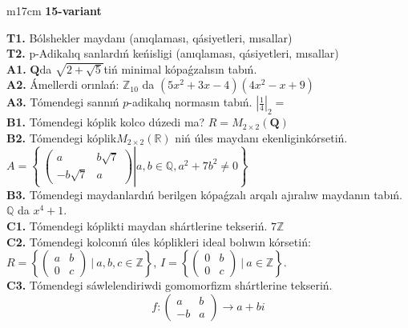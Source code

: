 \documentclass{article}
\begin{document}
\begin{tabular}{m{17cm}}
\textbf{15-variant}
\newline

\textbf{T1.} Bólshekler maydanı (anıqlaması, qásiyetleri, mısallar) \\
\textbf{T2.} p-Adikalıq sanlardıń keńisligi (anıqlaması, qásiyetleri, mısallar) \\
\textbf{A1.} \(\mathbf{Q}\)da \(\sqrt{2 + \sqrt{5}}\)tiń minimal kópaǵzalısın tabıń. \\
\textbf{A2.} Ámellerdi orınlań: \(\mathbb{Z}_{10}\) da \(\left( 5x^{2} + 3x - 4 \right)\left( 4x^{2} - x + 9 \right)\) \\
\textbf{A3.} Tómendegi sannıń \(p\)-adikalıq normasın tabıń. \(|\frac{1}{4}|_{2} =\) \\
\textbf{B1.} Tómendegi kóplik kolco dúzedi ma? \(R = M_{2 \times 2}\left( \mathbf{Q} \right)\) \\
\textbf{B2.} Tómendegi kóplik\(M_{2 \times 2}\left( \mathbb{R} \right)\) niń úles maydanı ekenliginkórsetiń. \(A = \left\{ \left. \ \begin{pmatrix}
a & b\sqrt{7} \\
 - b\sqrt{7} & a
\end{pmatrix} \right|a,b\mathbb{\in Q},a^{2} + 7b^{2} \neq 0 \right\}\) \\
\textbf{B3.} Tómendegi maydanlardıń berilgen kópaǵzalı arqalı ajıralıw maydanın tabıń. \(\mathbb{Q}\) da \(x^{4} + 1\). \\
\textbf{C1.} Tómendegi kóplikti maydan shártlerine tekseriń. \(7\mathbb{Z}\) \\
\textbf{C2.} Tómendegi kolconıń úles kóplikleri ideal bolıwın kórsetiń:
\(R = \left\{ \begin{pmatrix}
a & b \\
0 & c
\end{pmatrix}\ |\ a,b,c \in \mathbb{Z} \right\}\), \(I = \left\{ \begin{pmatrix}
0 & b \\
0 & c
\end{pmatrix}\ |\ a \in \mathbb{Z} \right\}\). \\
\textbf{C3.} Tómendegi sáwlelendiriwdi gomomorfizm shártlerine tekseriń.
\[f:\begin{pmatrix}
a & b \\
 - b & a
\end{pmatrix} \rightarrow a + bi\] \\

\end{tabular}
\vspace{1cm}
\end{document}
